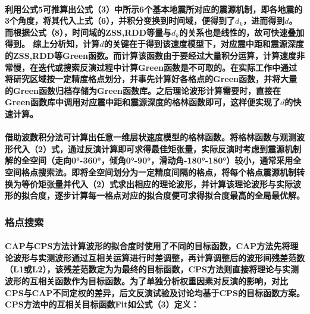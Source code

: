 \documentclass[a4paper,12pt,single,pdftex]{scrartcl}
\begin{document}
\label{ID_1121124158}\paragraph{}

\label{ID_1685002795}\paragraph{利用公式5可推算出公式（3）中所示6个基本地震所对应的震源机制，即各地震的3个角度，将其代入上式（6），并积分变换到时间域，便得到了$d_k$，进而得到$d$。而根据公式（8），时间域的ZSS,RDD等量与$d_k$的关系也是线性的，故可快速叠加得到。
综上分析知，计算$d$的关键在于得到该速度模型下，对应震中距和震源深度的ZSS,RDD等Green函数。而计算该函数由于要经过大量积分运算，计算速度非常慢，在迭代或搜索反演过程中计算Green函数是不可取的。在实际工作中通过将研究区域按一定精度格点划分，并事先计算好各格点的Green函数，并将大量的Green函数归档存储为Green函数库。之后理论波形计算需要时，直接在Green函数库中调用对应震中距和震源深度的格林函数即可，这样便实现了$d$的快速计算。}

\label{ID_1372162761}\paragraph{借助波数积分法\citep{Zhu2002}可计算出任意一维层状速度模型的格林函数。将格林函数与观测波形代入（2）式，通过反演计算即可求得最佳矩张量，实际反演时考虑到震源机制解的全空间（走向0°-360°，倾角0°-90°，滑动角-180°-180°）较小，通常采用全空间格点搜索法。即将全空间划分为一定精度间隔的格点，将每个格点震源机制转换为等价矩张量\citep{Jost1989}并代入（2）式求出相应的理论波形，并计算该理论波形与实际波形的拟合度，逐步计算每一格点对应的拟合度便可求得拟合度最高的全局最优解。}

\label{ID_424266573}\subsubsection{格点搜索}

\label{ID_1321964956}\paragraph{CAP与CPS方法计算波形的拟合度时使用了不同的目标函数，CAP方法先将理论波形与实测波形通过互相关运算进行时差调整，再计算调整后的波形间残差范数（L1或L2）\citep{Zhao1994}，该残差范数定为为最终的目标函数，CPS方法则直接将理论与实测波形的互相关函数作为目标函数。为了单独分析权重因素对反演的影响，对比CPS与CAP不同定权的差异，后文反演试验及讨论均基于CPS的目标函数方案。CPS方法中的互相关目标函数Fit如公式（3）定义：}
\end{document}
